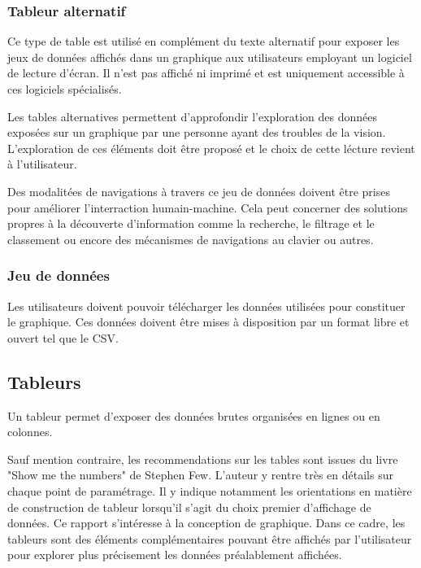 \documentclass[a4paper,12pt]{article}
\begin{document}
\begin{multicols}{2}
\subsubsection{Tableur alternatif}
\label{sec:org9799e29}
Ce type de table est utilisé en complément du texte alternatif pour exposer les jeux de données affichés dans un graphique aux utilisateurs employant un logiciel de lecture d'écran. Il n'est pas affiché ni imprimé et est uniquement accessible à ces logiciels spécialisés.

Les tables alternatives permettent d'approfondir l'exploration des données exposées sur un graphique par une personne ayant des troubles de la vision. L'exploration de ces éléments doit être proposé et le choix de cette lécture revient à l'utilisateur. \autocite{sarahfossheimCreatingBetterScreen2022}

Des modalitées de navigations à travers ce jeu de données doivent être prises pour améliorer l'interraction humain-machine. Cela peut concerner des solutions propres à la découverte d'information comme la recherche, le filtrage et le classement ou encore des mécanismes de navigations au clavier ou autres. \autocite{sarahfossheimCreatingBetterScreen2022}
\subsubsection{Jeu de données}
\label{sec:orge9a4804}
Les utilisateurs doivent pouvoir télécharger les données utilisées pour constituer le graphique. Ces données doivent être mises à disposition par un format libre et ouvert tel que le CSV. \autocite{frankelavskyRightToolsJob2022}
\subsection{Tableurs}
\label{sec:orgbbe5f56}
Un tableur permet d'exposer des données brutes organisées en lignes ou en colonnes. \autocite{mikeyiHowChooseRight2020}

Sauf mention contraire, les recommendations sur les tables sont issues du livre "Show me the numbers" de Stephen Few.\autocite{stephenfewShowMeNumbers2012} L'auteur y rentre très en détails sur chaque point de paramétrage. Il y indique notamment les orientations en matière de construction de tableur lorsqu'il s'agit du choix premier d'affichage de données. Ce rapport s'intéresse à la conception de graphique. Dans ce cadre, les tableurs sont des éléments complémentaires pouvant être affichés par l'utilisateur pour explorer plus précisement les données préalablement affichées.


\end{multicols}
\end{document}

